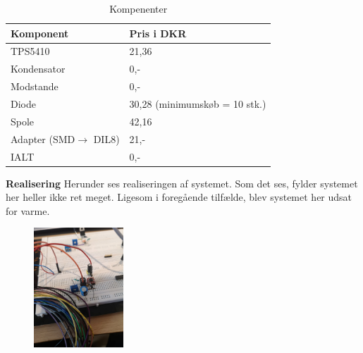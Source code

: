 \clearpage
\begin{table}[h]
  \centering
\begin{tabular}{ll}
\hline
Komponent & Pris i DKR \\
\hline
TPS5410 & 21,36 \\
\hline
Kondensator & 0,- \\
\hline
Modstande & 0,- \\
\hline
Diode & 30,28 (minimumskøb = 10 stk.) \\
\hline
Spole & 42,16 \\
\hline
Adapter (SMD$\rightarrow$  DIL8) & 21,- \\
\hline
IALT & 0,- \\
\hline
\end{tabular}
  \caption{Kompenenter}
  \label{tab:komp2}
\end{table}

\textbf{Realisering}\newline
Herunder ses realiseringen af systemet. 
Som det ses, fylder systemet her heller ikke ret meget. Ligesom i foregående tilfælde, blev systemet her udsat for varme. 

\begin{figure}[h]
  \centering
  \includegraphics[width=0.3\textwidth]{bil6.jpg}
  \caption{}
  \label{fig:bil77}
\end{figure}

